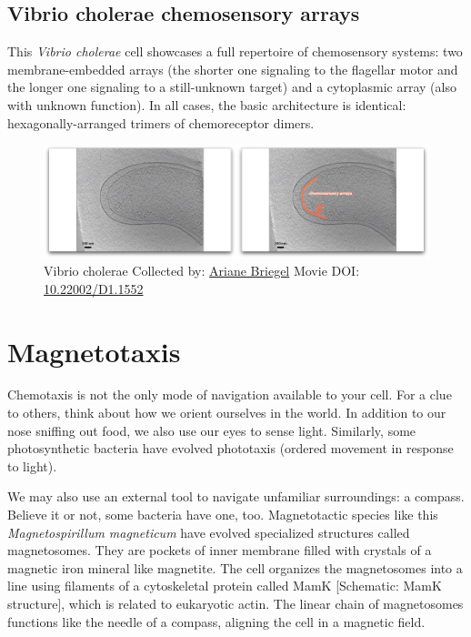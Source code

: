 \documentclass[]{tufte-book}
\begin{document}
\hypertarget{Vibrio_cholerae_chemosensory_arrays}{\subsection{Vibrio
cholerae chemosensory
arrays}\label{Vibrio_cholerae_chemosensory_arrays}}

This \emph{Vibrio cholerae} cell showcases a full repertoire of
chemosensory systems: two membrane-embedded arrays (the shorter one
signaling to the flagellar motor and the longer one signaling to a
still-unknown target) and a cytoplasmic array (also with unknown
function). In all cases, the basic architecture is identical:
hexagonally-arranged trimers of chemoreceptor dimers.





\begin{figure}
\includegraphics{movie_stills/7_5a} \caption[Vibrio cholerae Collected by:
\protect\hyperlink{ariane_briegel}{Ariane Briegel} Movie DOI:
\href{https://doi.org/10.22002/D1.1552}{10.22002/D1.1552}]{Vibrio cholerae Collected by:
\protect\hyperlink{ariane_briegel}{Ariane Briegel} Movie DOI:
\href{https://doi.org/10.22002/D1.1552}{10.22002/D1.1552}}\label{fig:7-5a}
\end{figure}

\section{Magnetotaxis}\label{magnetotaxis}

Chemotaxis is not the only mode of navigation available to your cell.
For a clue to others, think about how we orient ourselves in the world.
In addition to our nose sniffing out food, we also use our eyes to sense
light. Similarly, some photosynthetic bacteria have evolved phototaxis
(ordered movement in response to light).

We may also use an external tool to navigate unfamiliar surroundings: a
compass. Believe it or not, some bacteria have one, too. Magnetotactic
species like this \emph{Magnetospirillum magneticum} have evolved
specialized structures called magnetosomes. They are pockets of inner
membrane filled with crystals of a magnetic iron mineral like magnetite.
The cell organizes the magnetosomes into a line using filaments of a
cytoskeletal protein called MamK {[}Schematic: MamK structure{]}, which
is related to eukaryotic actin. The linear chain of magnetosomes
functions like the needle of a compass, aligning the cell in a magnetic
field.
\end{document}
